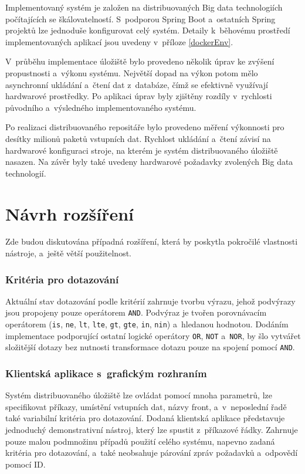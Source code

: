 Implementovaný systém je založen na distribuovaných Big data technologiích počítajících se škálovatelností. S~podporou Spring Boot a~ostatních Spring projektů lze jednoduše konfigurovat celý systém. Detaily k~běhovému prostředí implementovaných aplikací jsou uvedeny v~příloze \ref{dockerEnv}.

V~průběhu implementace úložiště bylo provedeno několik úprav ke zvýšení propustnosti a~výkonu systému. Největší dopad na výkon potom mělo asynchronní ukládání a~čtení dat z~databáze, čímž se efektivně využívají hardwarové prostředky. Po aplikaci úprav byly zjištěny rozdíly v~rychlosti původního a~výsledného implementovaného systému.

Po realizaci distribuovaného repositáře bylo provedeno měření výkonnosti pro desítky milionů paketů vstupních dat. Rychlost ukládání a~čtení závisí na hardwarové konfiguraci stroje, na kterém je systém distribuovaného úložiště nasazen. Na závěr byly také uvedeny hardwarové požadavky zvolených Big data technologií.

\section{Návrh rozšíření}
Zde budou diskutována případná rozšíření, která by poskytla pokročilé vlastnosti nástroje, a~ještě větší použitelnost.

\subsubsection{Kritéria pro dotazování}
Aktuální stav dotazování podle kritérií zahrnuje tvorbu výrazu, jehož podvýrazy jsou propojeny pouze operátorem \texttt{AND}. Podvýraz je tvořen porovnávacím operátorem (\texttt{is}, \texttt{ne}, \texttt{lt}, \texttt{lte}, \texttt{gt}, \texttt{gte}, \texttt{in}, \texttt{nin}) a~hledanou hodnotou. Dodáním implementace podporující ostatní logické operátory \texttt{OR}, \texttt{NOT} a~\texttt{NOR}, by šlo vytvářet složitější dotazy bez nutnosti transformace dotazu pouze na spojení pomocí \texttt{AND}.

\subsubsection{Klientská aplikace s~grafickým rozhraním}
Systém distribuovaného úložiště lze ovládat pomocí mnoha parametrů, lze specifikovat příkazy, umístění vstupních dat, názvy front, a~v~neposlední řadě také variabilní kritéria pro dotazování. Dodaná klientská aplikace představuje jednoduchý demonstrativní nástroj, který lze spustit z~příkazové řádky. Zahrnuje pouze malou podmnožinu případů použití celého systému, napevno zadaná kritéria pro dotazování, a~také neobsahuje párování zpráv požadavků a~odpovědí pomocí ID.

